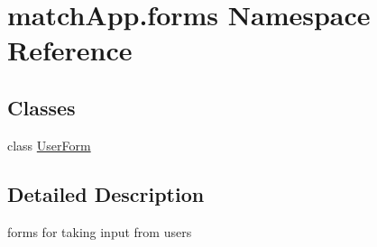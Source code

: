 \hypertarget{namespacematch_app_1_1forms}{}\section{match\+App.\+forms Namespace Reference}
\label{namespacematch_app_1_1forms}
\subsection*{Classes}
\begin{DoxyCompactItemize}
\item 
class \hyperlink{classmatch_app_1_1forms_1_1_user_form}{User\+Form}
\end{DoxyCompactItemize}


\subsection{Detailed Description}
\begin{DoxyVerb}forms for taking input from users\end{DoxyVerb}
 